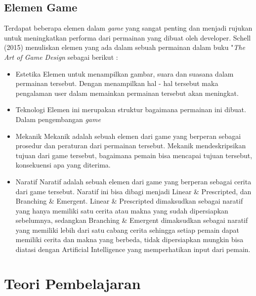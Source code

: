 	\subsection{Elemen Game}
	Terdapat beberapa elemen dalam \textit{game} yang sangat penting dan menjadi rujukan untuk meningkatkan performa dari permainan yang dibuat oleh developer. Schell (2015) menuliskan elemen yang ada dalam sebuah permainan dalam buku "\textit{The Art of Game Design} sebagai berikut :
	\begin{itemize}
		\item Estetika
			\subitem Elemen untuk menampilkan gambar, suara dan suasana dalam permainan tersebut. Dengan menampilkan hal - hal tersebut maka pengalaman user dalam memainkan permainan tersebut akan meningkat.
		\item Teknologi
			\subitem Elemen ini merupakan struktur bagaimana permainan ini dibuat. Dalam pengembangan \textit{game} 
		\item Mekanik
			\subitem Mekanik adalah sebuah elemen dari game yang berperan sebagai prosedur dan peraturan dari permainan tersebut. Mekanik mendeskripsikan tujuan dari game tersebut, bagaimana pemain bisa mencapai tujuan tersebut, konsekuensi apa yang diterima.
		\item Naratif
			\subitem Naratif adalah sebuah elemen dari game yang berperan sebagai cerita dari game tersebut. Naratif ini bisa dibagi menjadi Linear \& Prescripted, dan Branching \& Emergent. Linear \& Prescripted dimaksudkan sebagai naratif yang hanya memiliki satu cerita atau makna yang sudah dipersiapkan sebelumnya, sedangkan Branching \& Emergent dimaksudkan sebagai naratif yang memiliki lebih dari satu cabang cerita sehingga setiap pemain dapat memiliki cerita dan makna yang berbeda, tidak dipersiapkan mungkin bisa diatasi dengan Artificial Intelligence yang memperhatikan input dari pemain.
	\end{itemize}
	
\section{Teori Pembelajaran}
